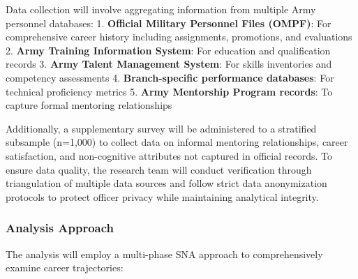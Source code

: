 \documentclass[
  letterpaper,
  DIV=11,
  numbers=noendperiod]{scrartcl}
\begin{document}
Data collection will involve aggregating information from multiple Army
personnel databases: 1. \textbf{Official Military Personnel Files
(OMPF)}: For comprehensive career history including assignments,
promotions, and evaluations 2. \textbf{Army Training Information
System}: For education and qualification records 3. \textbf{Army Talent
Management System}: For skills inventories and competency assessments 4.
\textbf{Branch-specific performance databases}: For technical
proficiency metrics 5. \textbf{Army Mentorship Program records}: To
capture formal mentoring relationships

Additionally, a supplementary survey will be administered to a
stratified subsample (n=1,000) to collect data on informal mentoring
relationships, career satisfaction, and non-cognitive attributes not
captured in official records. To ensure data quality, the research team
will conduct verification through triangulation of multiple data sources
and follow strict data anonymization protocols to protect officer
privacy while maintaining analytical integrity.

\subsubsection{Analysis Approach}\label{analysis-approach}

The analysis will employ a multi-phase SNA approach to comprehensively
examine career trajectories:
\end{document}
